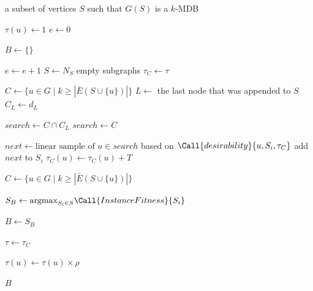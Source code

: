 \documentclass{article}
\begin{document}
\begin{algorithm}[H]
\caption{ACO}
\begin{minipage}{\textwidth}
\begin{algorithmic}
    \Ensure a subset of vertices $S$ such that $G(S)$ is a $k$-MDB

            \State $\tau(u) \gets 1$
        \EndFor
        \State $e \gets 0$

        \State $B \gets \{\}$
        
            \State $e \gets e + 1$
            \State $S \gets N_S$ empty subgraphs
            \State $\tau_C \gets \tau$
            
                \State $C \gets \{u \in G \mid k \geq |\bar{E}(S \cup \{u\})|\}$
                    \State $L \gets$ the last node that was appended to $S$
                    \State $C_L \gets d_L$

                        \State $search \gets C \cap C_L$
                    \Else
                        \State $search \gets C$
                    \EndIf

                    \State $next \gets \text{linear sample of } u \in search$ based on  $\Call{desirability}{u, S_i, \tau_C}$
                    \State add $next$ to $S_i$
                    \State $\tau_C(u) \gets \tau_C(u) + T$

                    \State $C \gets \{u \in G \mid k \geq |\bar{E}(S \cup \{u\})|\}$
                \EndWhile
            \EndForPar

            \State $S_B \gets \text{argmax}_{S_i \in S}{\Call{InstanceFitness}{S_i}}$ 

                \State $B \gets S_B$
            \EndIf

            \State $\tau \gets \tau_C$

                \State $\tau(u) \gets \tau(u) \times \rho$
            \EndFor
        \EndWhile
        
        \State \Return $B$
    \EndFunction
\end{algorithmic}
\end{minipage}
\end{algorithm}
\end{document}
